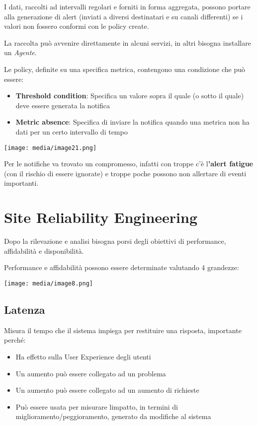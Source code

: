 I dati, raccolti ad intervalli regolari e forniti in forma aggregata,
possono portare alla generazione di alert (inviati a diversi destinatari
e su canali differenti) se i valori non fossero conformi con le policy
create.

La raccolta può avvenire direttamente in alcuni servizi, in altri
bisogna installare un \emph{Agente}.

Le policy, definite su una specifica metrica, contengono una condizione
che può essere:

\begin{itemize}
\item
  \textbf{Threshold condition}: Specifica un valore sopra il quale (o
  sotto il quale) deve essere generata la notifica
\item
  \textbf{Metric absence}: Specifica di inviare la notifica quando una
  metrica non ha dati per un certo intervallo di tempo
\end{itemize}

\texttt{[image: media/image21.png]}

Per le notifiche va trovato un compromesso, infatti con troppe c'è
l\textbf{'alert fatigue} (con il rischio di essere ignorate) e troppe
poche possono non allertare di eventi importanti.

\section{Site Reliability
Engineering}\label{site-reliability-engineering}

Dopo la rilevazione e analisi bisogna porsi degli obiettivi di
performance, affidabilità e disponibilità.

Performance e affidabilità possono essere determinate valutando 4
grandezze:

\texttt{[image: media/image8.png]}

\subsection{Latenza}\label{latenza}

Misura il tempo che il sistema impiega per restituire una risposta,
importante perché:

\begin{itemize}
\item
  Ha effetto sulla User Experience degli utenti
\item
  Un aumento può essere collegato ad un problema
\item
  Un aumento può essere collegato ad un aumento di richieste
\item
  Può essere usata per misurare l\textquotesingle impatto, in termini di
  miglioramento/peggioramento, generato da modifiche al sistema
\end{itemize}

